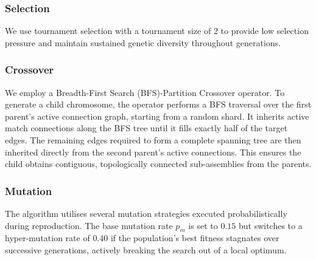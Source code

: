 \documentclass[conference]{IEEEtran}
\begin{document}
\subsubsection{Selection}
We use tournament selection with a tournament size of 2 to provide low selection pressure and maintain sustained genetic diversity throughout generations.

\subsubsection{Crossover}
We employ a Breadth-First Search (BFS)-Partition Crossover operator. To generate a child chromosome, the operator performs a BFS traversal over the first parent's active connection graph, starting from a random shard. It inherits active match connections along the BFS tree until it fills exactly half of the target edges. The remaining edges required to form a complete spanning tree are then inherited directly from the second parent’s active connections. This ensures the child obtains contiguous, topologically connected sub-assemblies from the parents.

\subsubsection{Mutation}
The algorithm utilises several mutation strategies executed probabilistically during reproduction. The base mutation rate $p_m$ is set to $0.15$ but switches to a hyper-mutation rate of $0.40$ if the population’s best fitness stagnates over successive generations, actively breaking the search out of a local optimum.
\end{document}
